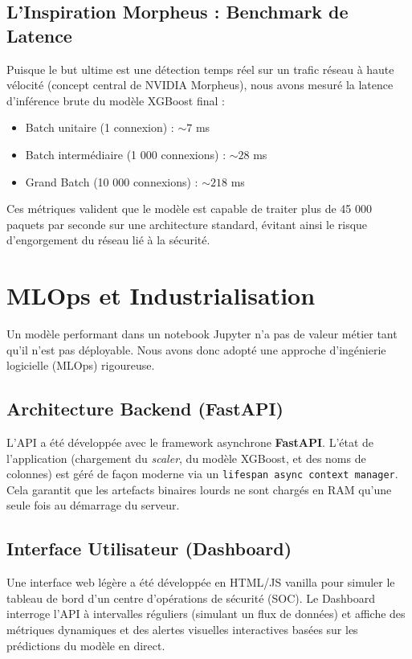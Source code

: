 \documentclass[12pt,a4paper]{report}
\begin{document}
\section{L'Inspiration Morpheus : Benchmark de Latence}
Puisque le but ultime est une détection temps réel sur un trafic réseau à haute vélocité (concept central de NVIDIA Morpheus), nous avons mesuré la latence d'inférence brute du modèle XGBoost final :
\begin{itemize}
    \item Batch unitaire (1 connexion) : $\sim 7$ ms
    \item Batch intermédiaire (1 000 connexions) : $\sim 28$ ms
    \item Grand Batch (10 000 connexions) : $\sim 218$ ms
\end{itemize}
Ces métriques valident que le modèle est capable de traiter plus de 45 000 paquets par seconde sur une architecture standard, évitant ainsi le risque d'engorgement du réseau lié à la sécurité.

\chapter{MLOps et Industrialisation}

Un modèle performant dans un notebook Jupyter n'a pas de valeur métier tant qu'il n'est pas déployable. Nous avons donc adopté une approche d'ingénierie logicielle (MLOps) rigoureuse.

\section{Architecture Backend (FastAPI)}
L'API a été développée avec le framework asynchrone \textbf{FastAPI}. 
L'état de l'application (chargement du \textit{scaler}, du modèle XGBoost, et des noms de colonnes) est géré de façon moderne via un \texttt{lifespan async context manager}. Cela garantit que les artefacts binaires lourds ne sont chargés en RAM qu'une seule fois au démarrage du serveur.

\section{Interface Utilisateur (Dashboard)}
Une interface web légère a été développée en HTML/JS vanilla pour simuler le tableau de bord d'un centre d'opérations de sécurité (SOC). Le Dashboard interroge l'API à intervalles réguliers (simulant un flux de données) et affiche des métriques dynamiques et des alertes visuelles interactives basées sur les prédictions du modèle en direct.
\end{document}
